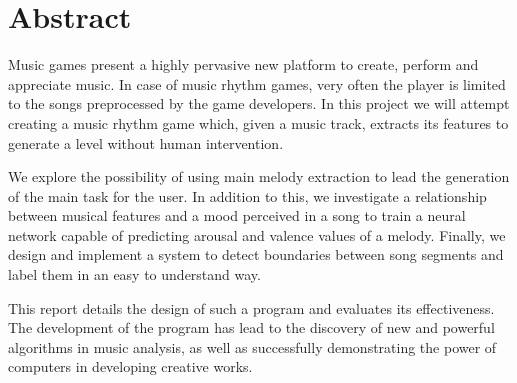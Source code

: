 
\chapter{Abstract} %

\label{Abstract} %


Music games present a highly pervasive new platform to create, perform and appreciate music. In  case of music rhythm games, very often the player is limited to the songs preprocessed by the game developers. In this project we will attempt creating a music rhythm game which, given a music track, extracts its features to generate a level without human intervention.

We explore the possibility of using main melody extraction to lead the generation of the main task for the user. In addition to this, we investigate a relationship between musical features and a mood perceived in a song to train a neural network capable of predicting arousal and valence values of a melody. Finally, we design and implement a system to detect boundaries between song segments and label them in an easy to understand way.

This report details the design of such a program and evaluates its effectiveness. The development of the program has lead to the discovery of new and powerful algorithms in music analysis, as well as successfully demonstrating the power of computers in developing creative works.


